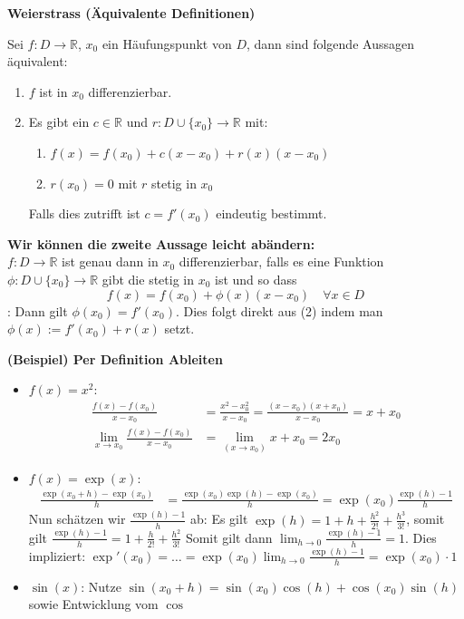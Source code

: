 \documentclass[25pt]{sciposter}
\newcommand{\R}{\mathbb{R}}
\newenvironment{method}[1]{\begin{mdframed}[backgroundcolor=blue!10,innertopmargin=15pt, innerbottommargin=15pt, nobreak=true]
		\textbf{#1 }
	}
	{ 
	\end{mdframed}
}
\begin{document}
\begin{multicols}{3}
\begin{method}{Weierstrass (Äquivalente Definitionen)}
Sei $f : D \to \R$, $x_0$ ein Häufungspunkt von $D$, dann sind folgende Aussagen äquivalent:
\begin{enumerate}
	\item $f$ ist in $x_0$ differenzierbar.
	\item Es gibt ein $c\in \R$ und $r : D \cup \{x_0\} \to \R$ mit:
	\begin{enumerate}
		\item $f(x) = f(x_0) + c(x-x_0) + r(x) (x-x_0)$
		\item $r(x_0) = 0$ mit $r$ stetig in $x_0$
	\end{enumerate}
Falls dies zutrifft ist $c=f'(x_0)$ eindeutig bestimmt.
\end{enumerate}

\textbf{Wir können die zweite Aussage leicht abändern:}\\
$f:D \to \R$ ist genau dann in $x_0$ differenzierbar, falls es eine Funktion $\phi : D \cup \{x_0\} \to \R$ gibt die stetig in $x_0$ ist und so dass 
$$f(x) = f(x_0) + \phi(x)(x-x_0) \quad \forall x \in D$$:
Dann gilt $\phi(x_0) = f'(x_0)$. Dies folgt direkt aus (2) indem man $\phi(x) := f'(x_0) + r(x)$ setzt.
\end{method}

\textbf{(Beispiel) Per Definition Ableiten}

\begin{itemize}
	\item $f(x) = x^2$:
	\begin{align*}
		\frac{f(x) - f(x_0)}{x-x_0} &= 	\frac{x^2 - x_{0}^2}{x-x_0} = \frac{(x-x_0) (x+x_0)}{x-x_0} = x + x_0\\
		\lim_{x \to x_0} \frac{f(x)-f(x_0)}{x-x_0} &= \lim_{(x\to x_0)} x + x_0 = 2x_0
	\end{align*}
	
	\item $f(x) = \exp(x)$:
	\begin{align*}
		\frac{\exp(x_0 + h ) - \exp(x_0)}{h} &= \frac{\exp(x_0)\exp(h) -\exp(x_0)}{h} = \exp(x_0) \frac{\exp(h) - 1}{h}
	\end{align*}
	Nun schätzen wir $\frac{\exp(h) - 1}{h}$ ab: Es gilt $\exp(h) = 1 + h + \frac{h^2}{2!} + \frac{h^3}{3!}$, somit gilt 
	$\frac{\exp(h) - 1}{h} = 1 + \frac{h}{2!} + \frac{h^2}{3!}$
	Somit gilt dann $\lim_{h \to 0} \frac{\exp(h) - 1}{h} = 1$. Dies impliziert:
	$\exp'(x_0) = \ldots = \exp(x_0) \lim_{h \to 0} \frac{\exp(h) - 1}{h} = \exp(x_0) \cdot 1$
	\item {\footnotesize $\sin(x)$: Nutze $\sin(x_0 + h ) = \sin(x_0)\cos(h) + \cos(x_0)\sin(h)$ sowie Entwicklung vom $\cos$}
\end{itemize}




\end{multicols}
\end{document}
